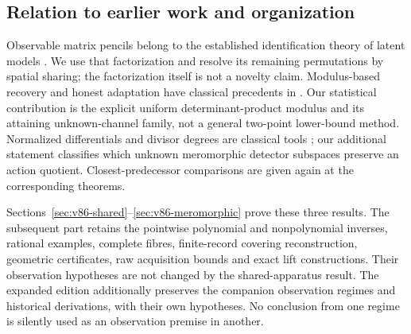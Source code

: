 \subsection{Relation to earlier work and organization}
Observable matrix pencils belong to the established identification
theory of latent models \cite{V83AMR,V83BJR}. We use that factorization
and resolve its remaining permutations by spatial sharing; the
factorization itself is not a novelty claim. Modulus-based recovery and
honest adaptation have classical precedents in
\cite{V86Donoho,V86CaiLow,V86Dufour}. Our statistical contribution is
the explicit uniform determinant-product modulus and its attaining
unknown-channel family, not a general two-point lower-bound method.
Normalized differentials and divisor degrees are classical tools
\cite{V86Forster,V86GKN}; our additional statement classifies which
unknown meromorphic detector subspaces preserve an action quotient.
Closest-predecessor comparisons are given again at the corresponding
theorems.

Sections~\ref{sec:v86-shared}--\ref{sec:v86-meromorphic} prove these
three results. The subsequent part retains the pointwise polynomial
and nonpolynomial inverses, rational examples, complete fibres,
finite-record covering reconstruction, geometric certificates, raw
acquisition bounds and exact lift constructions. Their observation
hypotheses are not changed by the shared-apparatus result. The expanded
edition additionally preserves the companion observation regimes and
historical derivations, with their own hypotheses. No conclusion from
one regime is silently used as an observation premise in another.
